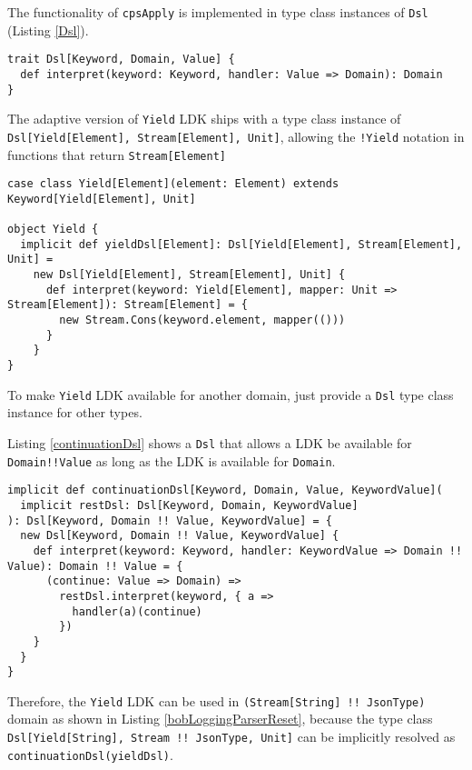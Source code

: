 The functionality of \lstinline{cpsApply} is implemented in type class instances of \lstinline{Dsl} (Listing \ref{Dsl}).

\begin{lstlisting}[caption={The type class to interpret \lstinline{cpsApply}},label={Dsl}]
trait Dsl[Keyword, Domain, Value] {
  def interpret(keyword: Keyword, handler: Value => Domain): Domain
}
\end{lstlisting}

The adaptive version of \lstinline{Yield} LDK ships with a type class instance of \lstinline{Dsl[Yield[Element], Stream[Element], Unit]}, allowing the \lstinline{!Yield} notation in functions that return \lstinline{Stream[Element]}

\begin{lstlisting}[caption={The \lstinline{Yield} LDK, the adaptive version},label={Yield}]
case class Yield[Element](element: Element) extends Keyword[Yield[Element], Unit]

object Yield {
  implicit def yieldDsl[Element]: Dsl[Yield[Element], Stream[Element], Unit] =
    new Dsl[Yield[Element], Stream[Element], Unit] {
      def interpret(keyword: Yield[Element], mapper: Unit => Stream[Element]): Stream[Element] = {
        new Stream.Cons(keyword.element, mapper(()))
      }
    }
}
\end{lstlisting}

To make \lstinline{Yield} LDK available for another domain, just provide a \lstinline{Dsl} type class instance for other types.

Listing \ref{continuationDsl} shows a \lstinline{Dsl} that allows a LDK be available for \lstinline{Domain!!Value} as long as the LDK is available for \lstinline{Domain}.

\begin{lstlisting}[caption={The \lstinline{Yield} LDK, the adaptive version},label={continuationDsl}]
implicit def continuationDsl[Keyword, Domain, Value, KeywordValue](
  implicit restDsl: Dsl[Keyword, Domain, KeywordValue]
): Dsl[Keyword, Domain !! Value, KeywordValue] = {
  new Dsl[Keyword, Domain !! Value, KeywordValue] {
    def interpret(keyword: Keyword, handler: KeywordValue => Domain !! Value): Domain !! Value = {
      (continue: Value => Domain) =>
        restDsl.interpret(keyword, { a =>
          handler(a)(continue)
        })
    }
  }
}
\end{lstlisting}

Therefore, the \lstinline{Yield} LDK can be used in \lstinline{(Stream[String] !! JsonType)} domain as shown in Listing \ref{bobLoggingParserReset}, because the type class \lstinline{Dsl[Yield[String], Stream !! JsonType, Unit]} can be implicitly resolved as \lstinline{continuationDsl(yieldDsl)}.

